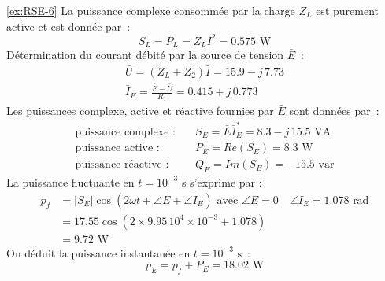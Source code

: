 \begin{solexercise}{\ref{ex:RSE-6}}
La puissance complexe  consommée par la charge $Z_L$ est purement
active et est donnée par~:
\[S_L=P_L=Z_LI^2=0.575 \text{~W}\]
Détermination du courant débité par la source de tension $\bar{E}$~:
\begin{gather*}
	\bar{U}=(Z_L+Z_2)\bar{I}=15.9-j\, 7.73\\
	\bar{I}_E= \frac{\bar{E}-\bar{U}}{R_1}=0.415+j\, 0.773
\end{gather*}
Les puissances complexe, active et réactive fournies par $\bar{E}$ sont données par~:
\begin{align*}
	\text{puissance complexe :}\quad & S_E=\bar{E}\bar{I}_E^*=8.3-j \,
	15.5\text{~VA}\\
	\text{puissance active :}\quad & P_E=Re(S_E)=8.3 \text{~W}\\
	\text{puissance réactive :}\quad & Q_E=Im(S_E)=-15.5 \text{~var}
\end{align*}
La puissance fluctuante en $t=10^{-3}$ s s'exprime par :
\begin{align*}
	p_f& =|S_E|\cos(2\omega t + \angle \bar{E}+\angle \bar{I}_E)
	\text{~avec~} \angle \bar{E}=0 \quad \angle \bar{I}_E=1.078
	\text{~rad}\\
	& = 17.55\cos(2\times 9.95\, 10^4\times 10^{-3}+1.078)\\
	& = 9.72 \text{~W}
\end{align*}
On déduit la puissance instantanée en $t=10^{-3}\text{ s}$~:
\[p_E=p_f+P_E=18.02 \text{~W}\]


\end{solexercise}
